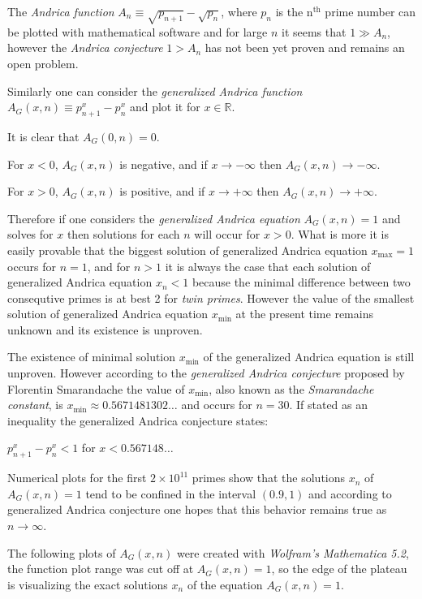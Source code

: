 \documentclass[12pt]{article}
\begin{document}
The \emph{Andrica function} $A_{n}\equiv\sqrt{p_{n+1}}-\sqrt{p_{n}}$, where $p_n$ is the n$^{\text{th}}$ prime number
can be plotted with mathematical software and for large $n$ it seems that $1\gg A_{n}$, however
the \emph{Andrica conjecture} $1>A_{n}$ has not been yet proven and
remains an open problem.

Similarly one can consider the \emph{generalized Andrica function}
$A_{G}(x,n)\equiv p_{n+1}^{x}-p_{n}^{x}$ and plot it for $x\in\mathbb{R}$.

It is clear that $ A_{G}(0,n)=0$.

For $x<0$, $A_{G}(x,n)$ is negative, and if $x\rightarrow-\infty$ then $A_{G}(x,n)\rightarrow-\infty$.

For $x>0$, $A_{G}(x,n)$ is positive, and if $x\rightarrow+\infty$ then $A_{G}(x,n)\rightarrow+\infty$.

Therefore if one considers the \emph{generalized Andrica equation}
$A_{G}(x,n)=1$ and solves for $x$ then solutions for each $n$ will occur
for $x>0$. What is more it is easily provable that the biggest solution of generalized Andrica equation $x_{\max}=1$
occurs for $n=1$, and for $n>1$ it is always the case that each solution of generalized Andrica equation $x_n<1$
because the minimal difference between two consequtive primes is at
best 2 for \emph{twin primes}. However the value of the smallest solution of generalized Andrica equation 
$x_{\min}$ at the present time remains unknown and its existence is unproven.

The existence of minimal solution $x_{\min}$ of the generalized Andrica equation is still unproven. However according to the \emph{generalized Andrica conjecture} proposed by Florentin Smarandache the value of $x_{\min}$, also known as the \emph{Smarandache constant}, is  $x_{\min}\approx0.5671481302\ldots$ and occurs for $n=30$. If stated as an inequality the generalized Andrica conjecture states:

$p _ {n+1} ^ x - p_ n ^ x < 1$ for $x < 0.567148 \ldots$

Numerical plots for the first $2\times10^{11}$ primes show that the solutions $x_n$ of $A_{G}(x,n)=1$ tend to be confined in the interval $(0.9,1)$ and according to generalized Andrica conjecture one hopes that this behavior remains true as $n\rightarrow\infty$.

The following plots of $A_G(x,n)$ were created with \emph{Wolfram's Mathematica 5.2}, the function plot range was cut off at $A_G(x,n)=1$, so the edge of the plateau is visualizing the exact solutions $x_n$ of the equation $A_G(x,n)=1$.
\end{document}
